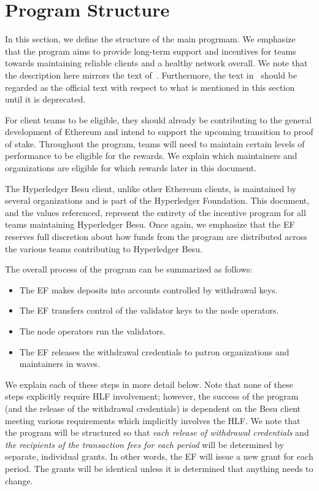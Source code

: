 
\section{Program Structure} \label{sec:structure}
In this section, we define the structure of the main progrmam.  We emphasize that the program aims to provide long-term support and incentives for teams towards maintaining reliable clients and a healthy network overall.  We note that the description here mirrors the text of~\cite{OfficialNotes}.  Furthermore, the text in~\cite{OfficialNotes} should be regarded as the official text with respect to what is mentioned in this section until it is deprecated.

For client teams to be eligible, they should already be contributing to the general development of Ethereum and intend to support the upcoming transition to proof of stake. Throughout the program, teams will need to maintain certain levels of performance to be eligible for the rewards.  We explain which maintainers and organizations are eligible for which rewards later in this document.

The Hyperledger Besu client, unlike other Ethereum clients, is maintained by several organizations and is part of the Hyperledger Foundation. This document, and the values referenced, represent the entirety of the incentive program for all teams maintaining Hyperledger Besu. Once again, we emphasize that the EF reserves full discretion about how funds from the program are distributed across the various teams contributing to Hyperledger Besu.

The overall process of the program can be summarized as follows:
\begin{itemize}
\item The EF makes deposits into accounts controlled by withdrawal keys.
\item The EF transfers control of the validator keys to the node operators.
\item The node operators run the validators.
\item The EF releases the withdrawal credentials to patron organizations and maintainers in waves.
\end{itemize}

We explain each of these steps in more detail below.  Note that none of these steps explicitly require HLF involvement; however, the success of the program (and the release of the withdrawal credentials) is dependent on the Besu client meeting various requirements which implicitly involves the HLF.  We note that the program will be structured so that \emph{each release of withdrawal credentials} and \emph{the recipients of the transaction fees for each period} will be determined by separate, individual grants.  In other words, the EF will issue a new grant for each period.  The grants will be identical unless it is determined that anything needs to change.

